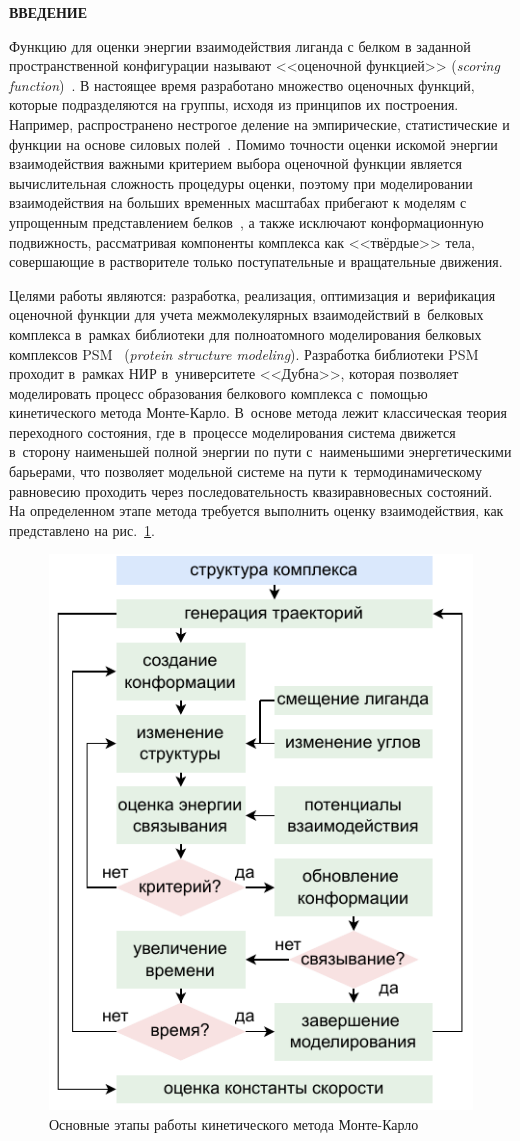 \onehalfspacing
\thispagestyle{empty} 

\newpage
\renewcommand{\contentsname}{\centerline{\large СОДЕРЖАНИЕ}}
\setcounter{page}{5}
\tableofcontents

\newpage
\begin{center}
  \textbf{\large ВВЕДЕНИЕ}
\end{center}

Функцию для оценки энергии взаимодействия лиганда с белком в заданной пространственной конфигурации называют <<оценочной функцией>> (\textit{scoring function})~\cite{lizunov}. В настоящее время разработано множество оценочных функций, которые подразделяются на группы, исходя из принципов их построения. Например, распространено нестрогое деление на эмпирические, статистические и функции на основе силовых полей~\cite{ci500731a}. Помимо точности оценки искомой энергии взаимодействия важными критерием выбора оценочной функции является вычислительная сложность процедуры оценки, поэтому при моделировании взаимодействия на больших временных масштабах прибегают к моделям с упрощенным представлением белков~\cite{biom10071056}, а также исключают конформационную подвижность, рассматривая компоненты комплекса как <<твёрдые>> тела, совершающие в растворителе только поступательные и вращательные движения.

Целями работы являются: разработка, реализация, оптимизация и~верификация оценочной функции для учета межмолекулярных взаимодействий в~белковых комплекса в~рамках библиотеки для полноатомного моделирования белковых комплексов PSM~\cite{psm} (\textit{protein structure modeling}). Разработка библиотеки PSM проходит в~рамках НИР в~университете <<Дубна>>, которая позволяет моделировать процесс образования белкового комплекса с~помощью кинетического метода Монте-Карло\cite{Voter}. В~основе метода лежит классическая теория переходного состояния, где в~процессе моделирования система движется в~сторону наименьшей полной энергии по пути с~наименьшими энергетическими барьерами, что позволяет модельной системе на пути к~термодинамическому равновесию проходить через последовательность квазиравновесных состояний. На определенном этапе метода требуется выполнить оценку взаимодействия, как представлено на рис.~\ref{monte}. 

\begin{figure}[h!]
	\centering
	\includegraphics[width=0.39\linewidth]{images/kmc.pdf}
	\caption{Основные этапы работы кинетического метода Монте-Карло}
	\label{monte}
\end{figure}

